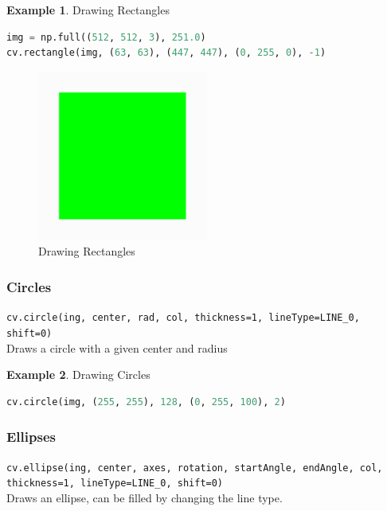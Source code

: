 \documentclass{article}
\theoremstyle{definition}
\newtheorem{ex}{Example}[subsection]
\theoremstyle{remark}
\newcommand{\func}[2]{\noindent\lstinline{#1}\\#2}
\begin{document}
\begin{ex}Drawing Rectangles
\begin{lstlisting}[language=Python]
img = np.full((512, 512, 3), 251.0)
cv.rectangle(img, (63, 63), (447, 447), (0, 255, 0), -1)
\end{lstlisting}


\begin{figure}[h!]
    \centering
    \includegraphics[width=0.5\textwidth]{opencv_rect}
    \caption{Drawing Rectangles}
    \label{fig:ocv_drw_rct}
\end{figure}
\end{ex}

\subsubsection{Circles}

\func{cv.circle(ing, center, rad, col, thickness=1, lineType=LINE_0, shift=0)}{
Draws a circle with a given center and radius
}

\begin{ex} Drawing Circles
\begin{lstlisting}[language=Python]
cv.circle(img, (255, 255), 128, (0, 255, 100), 2)
\end{lstlisting}
\end{ex}


\subsubsection{Ellipses}

\func{cv.ellipse(ing, center, axes, rotation, startAngle, endAngle, col, thickness=1, lineType=LINE_0, shift=0)}{
Draws an ellipse, can be filled by changing the line type. 
}
\end{document}
